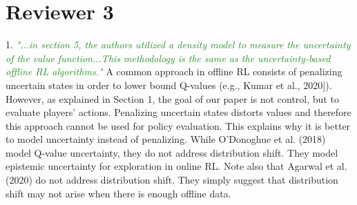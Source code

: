 \documentclass{article}
\begin{document}
\section{Reviewer 3}
1. \textcolor{ForestGreen}{\it 
"...in section 5, the authors utilized a density model to measure the uncertainty of the value function...This methodology is the same as the uncertainty-based offline RL algorithms."
}
A common approach in offline RL consists of penalizing uncertain states in order to lower bound Q-values (e.g., Kumar et al., 2020]).  However, as explained in Section 1, the goal of our paper is not control, but to evaluate players' actions.  Penalizing uncertain states distorts values and therefore this approach cannot be used for policy evaluation.  This explains why it is better to model uncertainty instead of penalizing.  While O'Donoghue et al. (2018) model Q-value uncertainty, they do not address distribution shift.  They model epistemic uncertainty for exploration in online RL.  Note also that Agarwal et al. (2020) do not address distribution shift.  They simply suggest that distribution shift may not arise when there is enough offline data.  

\end{document}
